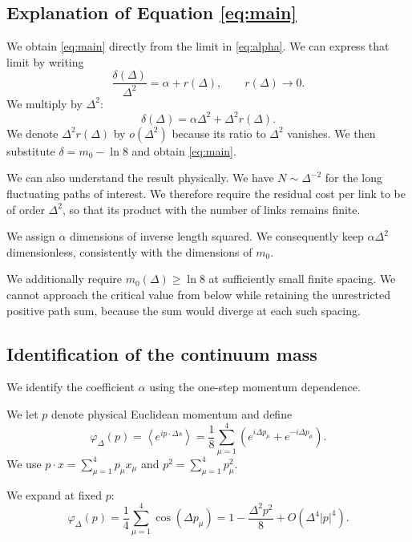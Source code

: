 \documentclass[11pt,a4paper]{article}
\numberwithin{equation}{section}
\begin{document}
\subsection{Explanation of Equation \eqref{eq:main}}

We obtain \eqref{eq:main} directly from the limit
in \eqref{eq:alpha}. We can express that limit by
writing
\[
    \frac{\delta(\Delta)}{\Delta^2}
    =
    \alpha+r(\Delta),
    \qquad
    r(\Delta)\longrightarrow0.
\]
We multiply by $\Delta^2$:
\[
    \delta(\Delta)
    =
    \alpha\Delta^2+\Delta^2r(\Delta).
\]
We denote $\Delta^2r(\Delta)$ by $o(\Delta^2)$
because its ratio to $\Delta^2$ vanishes. We then
substitute $\delta=m_0-\ln8$ and obtain
\eqref{eq:main}.

We can also understand the result physically.
We have $N\sim\Delta^{-2}$ for the long fluctuating
paths of interest. We therefore require the
residual cost per link to be of order $\Delta^2$,
so that its product with the number of links
remains finite.

We assign $\alpha$ dimensions of inverse length
squared. We consequently keep
$\alpha\Delta^2$ dimensionless, consistently with
the dimensions of $m_0$.

We additionally require
$m_0(\Delta)\geq\ln8$ at sufficiently small finite
spacing. We cannot approach the critical value
from below while retaining the unrestricted
positive path sum, because the sum would diverge
at each such spacing.

\subsection{Identification of the continuum mass}

We identify the coefficient $\alpha$ using the
one-step momentum dependence.

We let $p$ denote physical Euclidean momentum and
define
\begin{equation}
    \varphi_\Delta(p)
    =
    \left\langle e^{ip\cdot\Delta s}\right\rangle
    =
    \frac18\sum_{\mu=1}^{4}
    \left(e^{i\Delta p_\mu}
    +e^{-i\Delta p_\mu}\right).
\end{equation}
We use
$p\cdot x=\sum_{\mu=1}^{4}p_\mu x_\mu$ and
$p^2=\sum_{\mu=1}^{4}p_\mu^2$.

We expand at fixed $p$:
\begin{equation}
    \varphi_\Delta(p)
    =
    \frac14\sum_{\mu=1}^{4}\cos(\Delta p_\mu)
    =
    1-\frac{\Delta^2p^2}{8}
    +O(\Delta^4|p|^4).
\end{equation}
\end{document}
